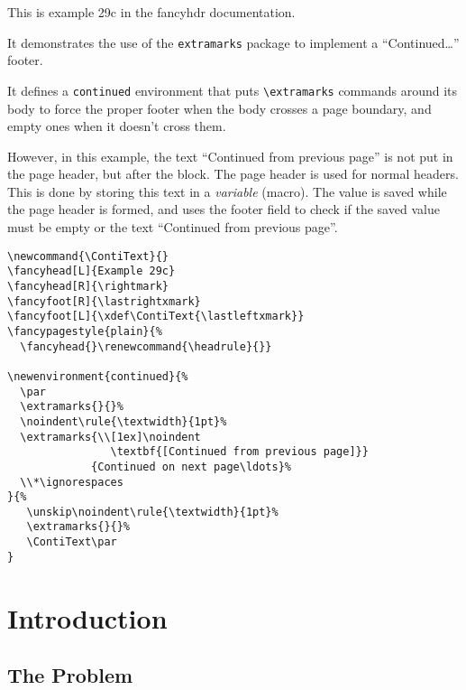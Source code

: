 \documentclass{report}
\newcommand{\ContiText}{}
\begin{document}
\tableofcontents

\thispagestyle{plain}
\noindent
\begin{boxedminipage}{\textwidth}
\small
This is example 29c in the fancyhdr documentation.

It demonstrates the use of the \texttt{extramarks} package to implement
a ``Continued\ldots'' footer.

It defines a \texttt{continued} environment that puts \verb|\extramarks| commands around its body to force the proper footer when the body crosses a page boundary, and empty ones when it doesn't cross them.

However, in this example, the text ``Continued from previous page'' is not put in the page header, but after the block. The page header is used for normal headers. This is done by storing this text in a \emph{variable} (macro). The value is saved while the page header is formed, and uses the footer field to check if the saved value must be empty or the text ``Continued from previous page''.

\begin{verbatim}
\newcommand{\ContiText}{}
\fancyhead[L]{Example 29c}
\fancyhead[R]{\rightmark}
\fancyfoot[R]{\lastrightxmark}
\fancyfoot[L]{\xdef\ContiText{\lastleftxmark}}
\fancypagestyle{plain}{%
  \fancyhead{}\renewcommand{\headrule}{}}

\newenvironment{continued}{%
  \par
  \extramarks{}{}%
  \noindent\rule{\textwidth}{1pt}%
  \extramarks{\\[1ex]\noindent
                \textbf{[Continued from previous page]}}
             {Continued on next page\ldots}%
  \\*\ignorespaces
}{%
   \unskip\noindent\rule{\textwidth}{1pt}%
   \extramarks{}{}%
   \ContiText\par
}
\end{verbatim}

\end{boxedminipage}

\pagestyle{fancy}

\newpage
{}
\chapter{Introduction}

\lipsum[1-4]

\section{The Problem}
\label{sec:problem}
\end{document}
